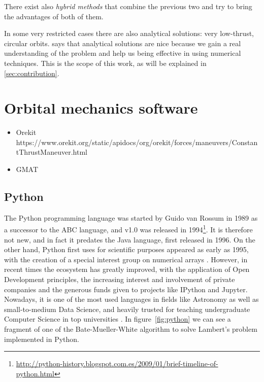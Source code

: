 There exist also \textit{hybrid methods} that combine the previous two and try to bring the advantages of both of them.

In some very restricted cases there are also analytical solutions: very low-thrust, circular orbits. \cite{lawden1963optimal} says that analytical solutions are nice because we gain a real understanding of the problem and help us being effective in using numerical techniques. This is the scope of this work, as will be explained in \ref{sec:contribution}.
% 
% 

\section{Orbital mechanics software}
% 
% 
% 
\begin{itemize}
\item Orekit https://www.orekit.org/static/apidocs/org/orekit/forces/maneuvers/ConstantThrustManeuver.html
\item GMAT 
\end{itemize}

\subsection{Python} \label{sec:python}

The Python programming language was started by Guido van Rossum in 1989 as a successor to the ABC language, and v1.0 was released in 1994\footnote{\url{http://python-history.blogspot.com.es/2009/01/brief-timeline-of-python.html}}. It is therefore not new, and in fact it predates the Java language, first released in 1996. On the other hand, Python first uses for scientific purposes appeared as early as 1995, with the creation of a special interest group on numerical arrays \cite{millman2011python}. However, in recent times the ecosystem has greatly improved, with the application of Open Development principles, the increasing interest and involvement of private companies and the generous funds given to projects like IPython \cite{perez2007ipython} and Jupyter. Nowadays, it is one of the most used languages in fields like Astronomy \cite{momcheva2015software} as well as small-to-medium Data Science, and heavily trusted for teaching undergraduate Computer Science in top universities \cite{guo2014python}. In figure~\ref{fig:python} we can see a fragment of one of the Bate-Mueller-White algorithm to solve Lambert's problem implemented in Python.

